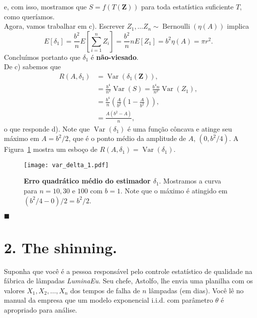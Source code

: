 \documentclass[a4paper,10pt, notitlepage]{report}
\newcommand{\vr}{\operatorname{Var}} %
\newcommand{\rs}{X_1, X_2, \ldots, X_n} %
\begin{document}
{$$$$
e, com isso, mostramos que $S = f(T(\boldsymbol{Z}))$ para toda estatística suficiente $T$, como queríamos.
\\
Agora, vamos trabalhar em c).
Escrever $Z_1, \ldots Z_n \sim \operatorname{Bernoulli}(\eta(A))$ implica
$$
E[\delta_1] = \frac{b^2}{n}E\left[\sum_{i=1}^n Z_i\right] = \frac{b^2}{n} n E[Z_1] = b^2\eta(A) = \pi r^2.
$$
Concluímos portanto que $\delta_1$ é \textbf{não-viesado}.
\\
De c) sabemos que 
\begin{align*}
R(A, \delta_1) &= \vr\left(\delta_1(\boldsymbol{Z})\right),\\
&= \frac{b^4}{n^2}\vr(S) = \frac{b^4n}{n^2}\vr(Z_1),\\
&= \frac{b^4}{n}\left(\frac{A}{b^2}\left(1-\frac{A}{b^2}\right)\right),\\
&= \frac{A(b^2-A)}{n},
\end{align*}
o que responde d).
Note que $\vr(\delta_1)$ é uma função côncava e atinge seu máximo em $A = b^2/2$, que é o ponto médio da amplitude de $A$, $(0, b^2/4)$.
A Figura~\ref{fig:var_delta_1} mostra um esboço de $R(A, \delta_1) = \vr\left(\delta_1\right)$.
\begin{figure}[!ht]
\begin{center}
\texttt{[image: var\_delta\_1.pdf]}    
\end{center}
\caption{\textbf{Erro quadrático médio do estimador $\delta_1$}.
Mostramos a curva para $n=10, 30$ e $100$ com $b=1$.
Note que o máximo é atingido em $(b^2/4 - 0)/2 = b^2/2$.
}
\label{fig:var_delta_1}
\end{figure}
$\blacksquare$
}
\newpage
\section*{2. The shinning.}

Suponha que você é a pessoa responsável pelo controle estatístico de qualidade na fábrica de lâmpadas \textit{LuminaEu}.
Seu chefe, Astolfo, lhe envia uma planilha com os valores $\rs$ dos tempos de falha de $n$ lâmpadas (em dias).
Você lê no manual da empresa que um modelo exponencial i.i.d. com parâmetro $\theta$ é apropriado para análise.
\end{document}
